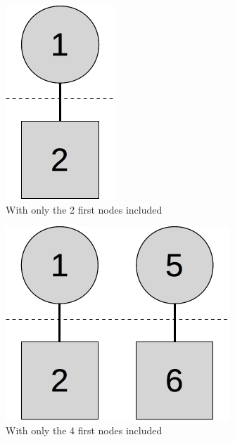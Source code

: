 \begin{figure}[ht]
  \centering
  \begin{subfigure}[t]{0.2\textwidth}
    \centering\includegraphics[scale=0.25]{figures/prece1.jpg}
    \caption{With only the 2 first nodes included \label{fig:prece1}}
  \end{subfigure}\hspace{0.5cm}
  \begin{subfigure}[t]{0.3\textwidth}
    \centering\includegraphics[scale=0.25]{figures/prece2}
    \caption{With only the 4 first nodes included\label{fig:prece2}}
  \end{subfigure}\hspace{0.5cm}
  \begin{subfigure}[t]{0.4\textwidth}

\end{subfigure}
\end{figure}
